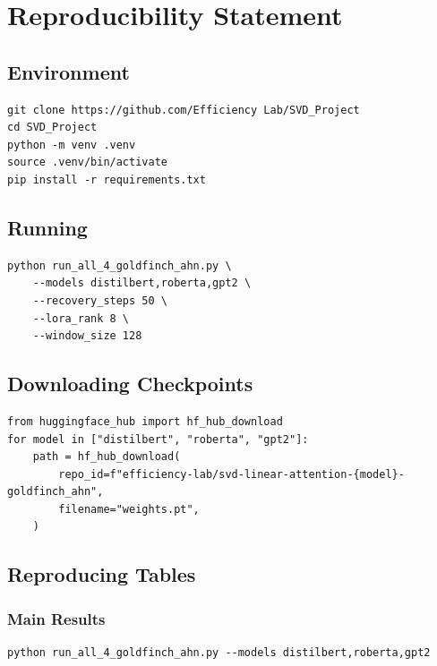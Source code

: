 
\section{Reproducibility Statement}

\subsection{Environment}

\begin{lstlisting}
git clone https://github.com/Efficiency Lab/SVD_Project
cd SVD_Project
python -m venv .venv
source .venv/bin/activate
pip install -r requirements.txt
\end{lstlisting}

\subsection{Running}

\begin{lstlisting}
python run_all_4_goldfinch_ahn.py \
    --models distilbert,roberta,gpt2 \
    --recovery_steps 50 \
    --lora_rank 8 \
    --window_size 128
\end{lstlisting}

\subsection{Downloading Checkpoints}

\begin{lstlisting}
from huggingface_hub import hf_hub_download
for model in ["distilbert", "roberta", "gpt2"]:
    path = hf_hub_download(
        repo_id=f"efficiency-lab/svd-linear-attention-{model}-goldfinch_ahn",
        filename="weights.pt",
    )
\end{lstlisting}

\subsection{Reproducing Tables}

\subsubsection{Main Results}

\begin{lstlisting}
python run_all_4_goldfinch_ahn.py --models distilbert,roberta,gpt2
\end{lstlisting}

